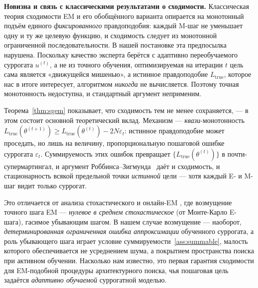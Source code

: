 \textbf{Новизна и связь с классическими результатами о сходимости.}
Классическая теория сходимости EM и его обобщённого варианта
\cite{dempster1977em, wu1983convergence} опирается на монотонный подъём
единого \emph{фиксированного} правдоподобия: каждый M-шаг не уменьшает
одну и ту же целевую функцию, и сходимость следует из монотонной
ограниченной последовательности. В нашей постановке эта предпосылка
нарушена. Поскольку качество эксперта берётся с адаптивно
переобучаемого суррогата $u^{(t)}$, а не из точного обучения,
оптимизируемая на итерации $t$ цель сама является «движущейся мишенью»,
а истинное правдоподобие $L_{\mathrm{true}}$, которое нас в итоге
интересует, алгоритмом \emph{никогда} не вычисляется. Поэтому точная
монотонность недоступна, и стандартный аргумент неприменим.

Теорема~\ref{thm:sgem} показывает, что сходимость тем не менее
сохраняется, --- в этом состоит основной теоретический вклад. Механизм
--- \emph{квази}-монотонность
$L_{\mathrm{true}}(\theta^{(t+1)}) \geq L_{\mathrm{true}}(\theta^{(t)}) - 2N\varepsilon_t$:
истинное правдоподобие может проседать, но лишь на величину,
пропорциональную пошаговой ошибке суррогата $\varepsilon_t$.
Суммируемость этих ошибок превращает
$\{L_{\mathrm{true}}(\theta^{(t)})\}$ в почти-супермартингал, и аргумент
Роббинса--Зигмунда~\cite{robbins1971convergence} даёт и сходимость, и
стационарность всякой предельной точки \emph{истинной} цели --- хотя
каждый E- и M-шаг видит только суррогат.

Это отличается от анализа стохастического и онлайн-EM
\cite{cappe2009online}, где возмущение точного шага EM ---
\emph{нулевое в среднем стохастическое} (от Монте-Карло E-шага),
гасимое убывающим шагом. В нашем случае возмущение --- наоборот,
\emph{детерминированная ограниченная ошибка аппроксимации} обученного
суррогата, а роль убывающего шага играет условие
суммируемости~\ref{ass:summable}, малость которого обеспечивается не
усреднением шума, а покрытием пространства поиска при активном обучении.
Насколько нам известно, это первая гарантия сходимости для EM-подобной
процедуры архитектурного поиска, чья пошаговая цель задаётся
\emph{адаптивно обучаемой} суррогатной моделью.
